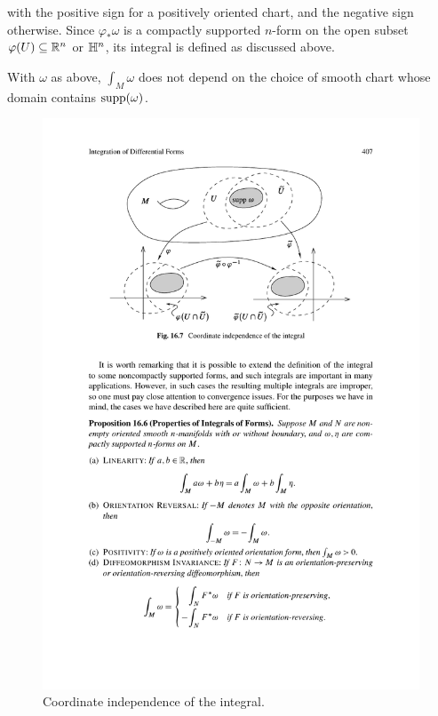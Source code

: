with the positive sign for a positively oriented chart, and the negative sign otherwise. Since $\varphi_*\omega$ is a compactly supported $n$-form on the open subset $\varphi(U)\subseteq\mathbb{R}^n$ or $\mathbb{H}^n$, its integral is defined as discussed above.
\begin{proposition}\label{inte form one chart}
With $\omega$ as above, $\int_M\omega$ does not depend on the choice of smooth chart whose domain contains $\mathrm{supp}(\omega)$.
\end{proposition}
\begin{figure}[htbp]
\centering
\includegraphics{pictures/int-form-coordinate}
\caption{Coordinate independence of the integral.}
\end{figure}
